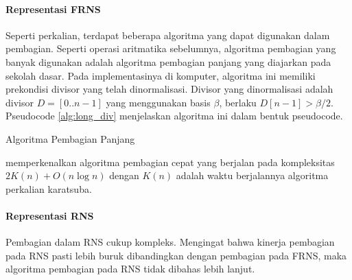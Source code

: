     \paragraph{Representasi FRNS}
    Seperti perkalian, terdapat beberapa algoritma yang dapat digunakan dalam pembagian. Seperti operasi aritmatika sebelumnya, algoritma pembagian yang banyak digunakan adalah algoritma pembagian panjang yang diajarkan pada sekolah dasar. Pada implementasinya di komputer, algoritma ini memiliki prekondisi divisor yang telah dinormalisasi. Divisor yang dinormalisasi adalah divisor $D = [0..n-1]$ yang menggunakan basis $\beta$, berlaku $D[n-1] > \beta/2$. Pseudocode \ref{alg:long_div} menjelaskan algoritma ini dalam bentuk pseudocode.

    \begin{algorithm}
      \caption{Algoritma Pembagian Panjang}
      \label{alg:long_div}
      \begin{algorithmic}[1]
        \Statex
          \Else
          \EndIf
            \EndWhile
            \State {}
          \EndFor
        \EndFunction
      \end{algorithmic}

    \end{algorithm}

    \citet{div_burnikel_ziegler} memperkenalkan algoritma pembagian cepat yang berjalan pada kompleksitas $2K(n)+O(n \log n)$ dengan $K(n)$ adalah waktu berjalannya algoritma perkalian karatsuba.

    \paragraph{Representasi RNS}

    Pembagian dalam RNS cukup kompleks. Mengingat bahwa kinerja pembagian pada RNS pasti lebih buruk dibandingkan dengan pembagian pada FRNS, maka algoritma pembagian pada RNS tidak dibahas lebih lanjut.

